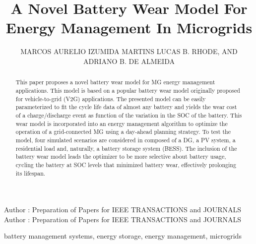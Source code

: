 \documentclass{ieeeaccess}
\begin{document}
    


    \title{A Novel Battery Wear Model For Energy Management In Microgrids}

    \author{
    	\uppercase{Marcos Aurelio Izumida Martins}
    	\uppercase{Lucas B. Rhode},
    	\uppercase{and Adriano B. de Almeida}
    }

    \address[1]{Sustainable Energies Center, CERTI Foundation, Brazil (e-mail: mlz@certi.org.br)}
    \address[2]{Underwriters Laboratories, Brazil (e-mail: lucas.rhode@ul.com)}
    \address[3]{Western Parana State University, Brazil (e-mail: adriano.almeida@unioeste.br)}

    \markboth
    {Author \headeretal: Preparation of Papers for IEEE TRANSACTIONS and JOURNALS}
    {Author \headeretal: Preparation of Papers for IEEE TRANSACTIONS and JOURNALS}


    \begin{abstract}
        This paper proposes a novel battery wear model for \ac{MG} energy management applications. This model is based on a popular battery wear model originally proposed for vehicle-to-grid (V2G) applications. The presented model can be easily parameterized to fit the cycle life data of almost any battery and yields the wear cost of a charge/discharge event as function of the variation in the \ac{SOC} of the battery. This wear model is incorporated into an energy management algorithm to optimize the operation of a grid-connected \ac{MG} using a day-ahead planning strategy. To test the model, four simulated scenarios are considered in  composed of a \ac{DG}, a \ac{PV} system, a residential load and, naturally, a battery storage system (\ac{BESS}). The inclusion of the battery wear model leads the optimizer to be more selective about battery usage, cycling the battery at \ac{SOC} levels that minimized battery wear, effectively prolonging its lifespan.
    \end{abstract}

    \begin{keywords}
        battery management systems, energy storage, energy management, microgrids
    \end{keywords}
\end{document}
